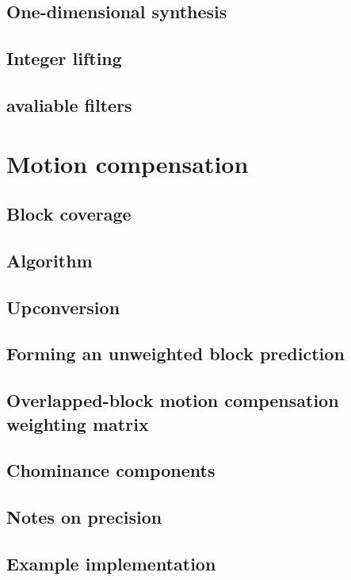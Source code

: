 \subsection{One-dimensional synthesis}
\subsection{Integer lifting}
\subsection{avaliable filters}



\clearpage
\section{Motion compensation}
\subsection{Block coverage}
\subsection{Algorithm}
\subsection{Upconversion}
\subsection{Forming an unweighted block prediction}
\subsection{Overlapped-block motion compensation weighting matrix}
\subsection{Chominance components}
\subsection{Notes on precision}
\subsection{Example implementation}













